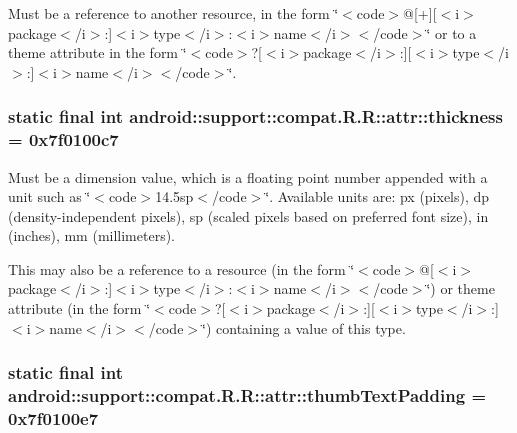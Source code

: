 Must be a reference to another resource, in the form \char`\"{}$<$code$>$@\mbox{[}+\mbox{]}\mbox{[}$<$i$>$package$<$/i$>$:\mbox{]}$<$i$>$type$<$/i$>$:$<$i$>$name$<$/i$>$$<$/code$>$\char`\"{} or to a theme attribute in the form \char`\"{}$<$code$>$?\mbox{[}$<$i$>$package$<$/i$>$:\mbox{]}\mbox{[}$<$i$>$type$<$/i$>$:\mbox{]}$<$i$>$name$<$/i$>$$<$/code$>$\char`\"{}. \hypertarget{classandroid_1_1support_1_1compat_1_1_r_1_1attr_f05d60ba8c17373b0c121ceccab9e64f}{
\subsubsection[{thickness}]{\setlength{\rightskip}{0pt plus 5cm}static final int android::support::compat.R.R::attr::thickness = 0x7f0100c7}}
\label{classandroid_1_1support_1_1compat_1_1_r_1_1attr_f05d60ba8c17373b0c121ceccab9e64f}


Must be a dimension value, which is a floating point number appended with a unit such as \char`\"{}$<$code$>$14.5sp$<$/code$>$\char`\"{}. Available units are: px (pixels), dp (density-independent pixels), sp (scaled pixels based on preferred font size), in (inches), mm (millimeters). 

This may also be a reference to a resource (in the form \char`\"{}$<$code$>$@\mbox{[}$<$i$>$package$<$/i$>$:\mbox{]}$<$i$>$type$<$/i$>$:$<$i$>$name$<$/i$>$$<$/code$>$\char`\"{}) or theme attribute (in the form \char`\"{}$<$code$>$?\mbox{[}$<$i$>$package$<$/i$>$:\mbox{]}\mbox{[}$<$i$>$type$<$/i$>$:\mbox{]}$<$i$>$name$<$/i$>$$<$/code$>$\char`\"{}) containing a value of this type. \hypertarget{classandroid_1_1support_1_1compat_1_1_r_1_1attr_8fe60176e4576154c665e1860be2bced}{
\subsubsection[{thumbTextPadding}]{\setlength{\rightskip}{0pt plus 5cm}static final int android::support::compat.R.R::attr::thumbTextPadding = 0x7f0100e7}}
\label{classandroid_1_1support_1_1compat_1_1_r_1_1attr_8fe60176e4576154c665e1860be2bced}


